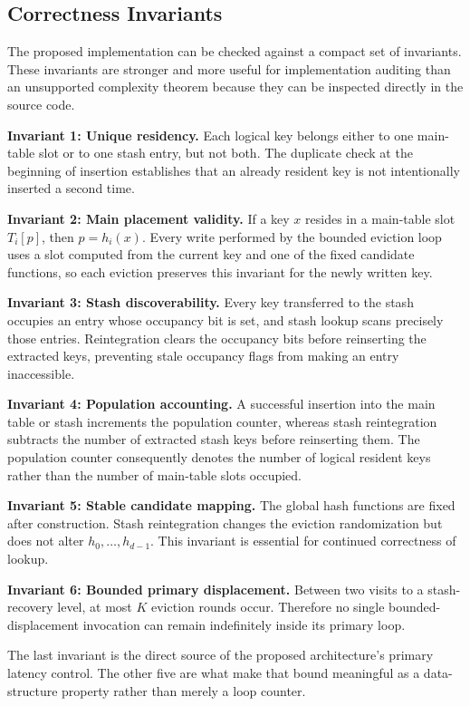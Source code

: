 \documentclass[conference]{IEEEtran}
\begin{document}
\subsection{Correctness Invariants}

The proposed implementation can be checked against a compact set of invariants. These invariants are stronger and more useful for implementation auditing than an unsupported complexity theorem because they can be inspected directly in the source code.

\textbf{Invariant 1: Unique residency.} Each logical key belongs either to one main-table slot or to one stash entry, but not both. The duplicate check at the beginning of insertion establishes that an already resident key is not intentionally inserted a second time.

\textbf{Invariant 2: Main placement validity.} If a key $x$ resides in a main-table slot $T_i[p]$, then $p=h_i(x)$. Every write performed by the bounded eviction loop uses a slot computed from the current key and one of the fixed candidate functions, so each eviction preserves this invariant for the newly written key.

\textbf{Invariant 3: Stash discoverability.} Every key transferred to the stash occupies an entry whose occupancy bit is set, and stash lookup scans precisely those entries. Reintegration clears the occupancy bits before reinserting the extracted keys, preventing stale occupancy flags from making an entry inaccessible.

\textbf{Invariant 4: Population accounting.} A successful insertion into the main table or stash increments the population counter, whereas stash reintegration subtracts the number of extracted stash keys before reinserting them. The population counter consequently denotes the number of logical resident keys rather than the number of main-table slots occupied.

\textbf{Invariant 5: Stable candidate mapping.} The global hash functions are fixed after construction. Stash reintegration changes the eviction randomization but does not alter $h_0,\ldots,h_{d-1}$. This invariant is essential for continued correctness of lookup.

\textbf{Invariant 6: Bounded primary displacement.} Between two visits to a stash-recovery level, at most $K$ eviction rounds occur. Therefore no single bounded-displacement invocation can remain indefinitely inside its primary loop.

The last invariant is the direct source of the proposed architecture's primary latency control. The other five are what make that bound meaningful as a data-structure property rather than merely a loop counter.
\end{document}
